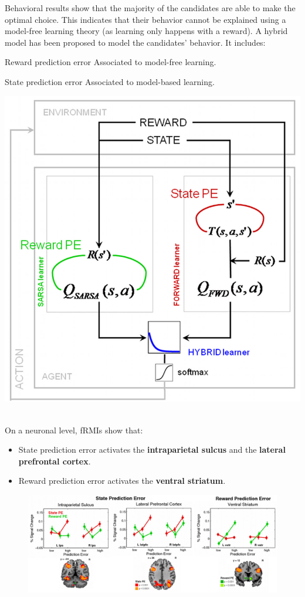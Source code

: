 \begin{casestudy}
    \begin{minipage}{0.6\linewidth}
        Behavioral results show that the majority of the candidates are able to make the optimal choice.
        This indicates that their behavior cannot be explained using a model-free learning theory (as learning only happens with a reward).
        A hybrid model has been proposed to model the candidates' behavior. It includes:
        \begin{descriptionlist}
            \item[Reward prediction error] Associated to model-free learning.
            \item[State prediction error] Associated to model-based learning.
        \end{descriptionlist}
    \end{minipage}
    \begin{minipage}{0.4\linewidth}
        \centering
        \includegraphics[width=0.7\linewidth]{./img/human_latent_experiment3.png}
    \end{minipage}\\[1em]

    On a neuronal level, fRMIs show that:
    \begin{itemize}
        \item State prediction error activates the \textbf{intraparietal sulcus} and the \textbf{lateral prefrontal cortex}.
        \item Reward prediction error activates the \textbf{ventral striatum}.
    \end{itemize}
    \begin{figure}[H]
        \centering
        \includegraphics[width=0.75\linewidth]{./img/human_latent_experiment4.png}
    \end{figure}
\end{casestudy}

